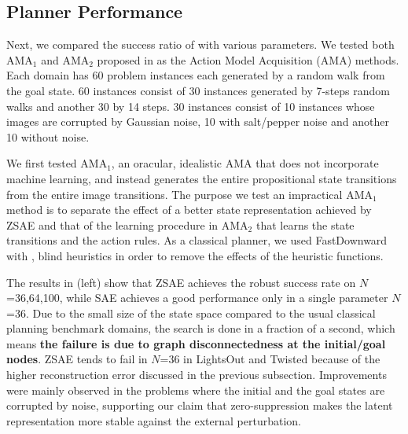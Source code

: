 \subsection{Planner Performance}

Next, we compared the success ratio of \latentplanner with various parameters.
We tested both AMA$_1$ and AMA$_2$ proposed in \cite{Asai2018} as the Action Model Acquisition (AMA) methods.
% 
Each domain has 60 problem instances each generated by a random walk from
the goal state. 60 instances consist of 30 instances generated by 7-steps random walks
and another 30 by 14 steps. 30 instances consist of 10 instances whose images are corrupted by Gaussian noise,
10 with salt/pepper noise and another 10 without noise.

We first tested AMA$_1$, an oracular, idealistic AMA that does not incorporate machine learning,
and instead generates the entire propositional state transitions from the entire image transitions.
The purpose we test an impractical AMA$_1$ method is
to separate the effect of a better state representation achieved by ZSAE
and that of the learning procedure in AMA$_2$ that learns the state transitions and the action rules.
As a classical planner, we used FastDownward \cite{Helmert04} with \astar, blind heuristics in order to
remove the effects of the heuristic functions.

The results in  (left) show that ZSAE achieves the robust success rate on $N$=36,64,100,
while SAE achieves a good performance only in a single parameter $N$=36.
% 
Due to the small size of the state space compared to the usual classical planning benchmark domains,
the search is done in a fraction of a second, which means \textbf{the failure is due to graph disconnectedness at the initial/goal nodes}.
ZSAE tends to fail in $N$=36 in LightsOut and Twisted because of the higher reconstruction error
discussed in the previous subsection.
% 
Improvements were mainly observed in the problems where
the initial and the goal states are corrupted by noise, supporting our claim that
zero-suppression makes the latent representation more stable against the external perturbation.

